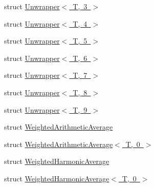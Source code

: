 \begin{DoxyCompactItemize}
\item 
struct \mbox{\hyperlink{structmpc_1_1utilities_1_1_unwrapper_3_01_t_00_013_01_4}{Unwrapper$<$ T, 3 $>$}}
\item 
struct \mbox{\hyperlink{structmpc_1_1utilities_1_1_unwrapper_3_01_t_00_014_01_4}{Unwrapper$<$ T, 4 $>$}}
\item 
struct \mbox{\hyperlink{structmpc_1_1utilities_1_1_unwrapper_3_01_t_00_015_01_4}{Unwrapper$<$ T, 5 $>$}}
\item 
struct \mbox{\hyperlink{structmpc_1_1utilities_1_1_unwrapper_3_01_t_00_016_01_4}{Unwrapper$<$ T, 6 $>$}}
\item 
struct \mbox{\hyperlink{structmpc_1_1utilities_1_1_unwrapper_3_01_t_00_017_01_4}{Unwrapper$<$ T, 7 $>$}}
\item 
struct \mbox{\hyperlink{structmpc_1_1utilities_1_1_unwrapper_3_01_t_00_018_01_4}{Unwrapper$<$ T, 8 $>$}}
\item 
struct \mbox{\hyperlink{structmpc_1_1utilities_1_1_unwrapper_3_01_t_00_019_01_4}{Unwrapper$<$ T, 9 $>$}}
\item 
struct \mbox{\hyperlink{structmpc_1_1utilities_1_1_weighted_arithmetic_average}{Weighted\+Arithmetic\+Average}}
\item 
struct \mbox{\hyperlink{structmpc_1_1utilities_1_1_weighted_arithmetic_average_3_01_t_00_010_01_4}{Weighted\+Arithmetic\+Average$<$ T, 0 $>$}}
\item 
struct \mbox{\hyperlink{structmpc_1_1utilities_1_1_weighted_harmonic_average}{Weighted\+Harmonic\+Average}}
\item 
struct \mbox{\hyperlink{structmpc_1_1utilities_1_1_weighted_harmonic_average_3_01_t_00_010_01_4}{Weighted\+Harmonic\+Average$<$ T, 0 $>$}}
\end{DoxyCompactItemize}
